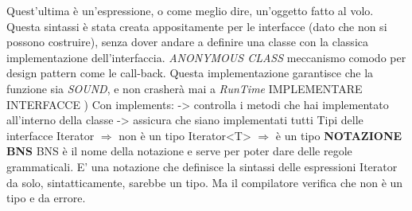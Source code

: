 Quest'ultima è un'espressione, o come meglio dire, un'oggetto fatto al volo. Questa sintassi è stata creata appositamente per le interfacce (dato che non si possono costruire), senza dover andare a definire una classe con la classica implementazione dell'interfaccia. \newline
\textit{ANONYMOUS CLASS} meccanismo comodo per design pattern come le call-back. \newline
Questa implementazione garantisce che la funzione sia \textit{SOUND}, e non crasherà mai a \textit{RunTime}
\newline
IMPLEMENTARE INTERFACCE ) Con implements: \newline
-> controlla i metodi che hai implementato all'interno della classe \newline
-> assicura che siano implementati tutti \newline
Tipi delle interfacce \newline
Iterator $\Rightarrow$ non è un tipo \newline
Iterator<T> $\Rightarrow$ è un tipo \newline
\textbf{NOTAZIONE BNS} \newline
BNS è il nome della notazione e serve per poter dare delle regole grammaticali. E' una notazione che definisce la sintassi delle espressioni\newline
Iterator da solo, sintatticamente, sarebbe un tipo. Ma il compilatore verifica che non è un tipo e da errore.








\newpage 

